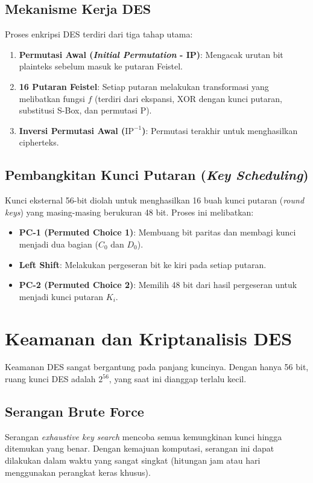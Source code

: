 \documentclass[../main.tex]{subfiles}
\begin{document}
\subsection{Mekanisme Kerja DES}
Proses enkripsi DES terdiri dari tiga tahap utama:
\begin{enumerate}
    \item \textbf{Permutasi Awal (\textit{Initial Permutation} - IP)}: Mengacak urutan bit plainteks sebelum masuk ke putaran Feistel.
    \item \textbf{16 Putaran Feistel}: Setiap putaran melakukan transformasi yang melibatkan fungsi $f$ (terdiri dari ekspansi, XOR dengan kunci putaran, substitusi S-Box, dan permutasi P).
    \item \textbf{Inversi Permutasi Awal ($\text{IP}^{-1}$)}: Permutasi terakhir untuk menghasilkan cipherteks.
\end{enumerate}

\subsection{Pembangkitan Kunci Putaran (\textit{Key Scheduling})}
Kunci eksternal 56-bit diolah untuk menghasilkan 16 buah kunci putaran (\textit{round keys}) yang masing-masing berukuran 48 bit. Proses ini melibatkan:
\begin{itemize}
    \item \textbf{PC-1 (Permuted Choice 1)}: Membuang bit paritas dan membagi kunci menjadi dua bagian ($C_0$ dan $D_0$).
    \item \textbf{Left Shift}: Melakukan pergeseran bit ke kiri pada setiap putaran.
    \item \textbf{PC-2 (Permuted Choice 2)}: Memilih 48 bit dari hasil pergeseran untuk menjadi kunci putaran $K_i$.
\end{itemize}

\section{Keamanan dan Kriptanalisis DES}
Keamanan DES sangat bergantung pada panjang kuncinya. Dengan hanya 56 bit, ruang kunci DES adalah $2^{56}$, yang saat ini dianggap terlalu kecil.

\subsection{Serangan Brute Force}
Serangan \textit{exhaustive key search} mencoba semua kemungkinan kunci hingga ditemukan yang benar. Dengan kemajuan komputasi, serangan ini dapat dilakukan dalam waktu yang sangat singkat (hitungan jam atau hari menggunakan perangkat keras khusus).
\end{document}
